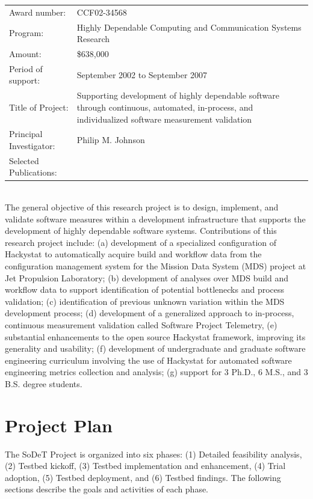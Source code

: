 \begin{tabular}{lp{4.5in}}

Award number: & CCF02-34568 \\
Program: & Highly Dependable Computing and Communication Systems Research\\
Amount: & \$638,000 \\
Period of support: & September 2002 to September 2007 \\
Title of Project: & Supporting development of highly dependable software through
continuous, automated, in-process, and individualized software measurement validation \\
Principal Investigator: & Philip M. Johnson \\
Selected Publications: & \cite{csdl2-04-22,csdl2-04-13,csdl2-04-11,csdl2-03-12,
csdl2-02-07,csdl2-03-07,csdl2-04-02,csdl2-04-04,csdl2-04-11,csdl2-06-07,csdl2-06-08,csdl2-06-13,csdl2-06-06}
\end{tabular} \\ %

The general objective of this  research project is to design,
implement, and validate software measures within a development
infrastructure that supports the development of highly dependable software
systems.  Contributions of this research project include: (a) development
of a specialized configuration of Hackystat to automatically acquire build
and workflow data from the configuration management system for the Mission
Data System (MDS) project at Jet Propulsion Laboratory; (b) development of
analyses over MDS build and workflow data to support identification of
potential bottlenecks and process validation; (c) identification of
previous unknown variation within the MDS development process; (d)
development of a generalized approach to in-process, continuous measurement
validation called Software Project Telemetry, (e) substantial enhancements
to the open source Hackystat framework, improving its generality and
usability; (f) development of undergraduate and graduate software
engineering curriculum involving the use of Hackystat for automated
software engineering metrics collection and analysis; (g) support for 3
Ph.D., 6 M.S., and 3 B.S. degree students.


\section{Project Plan}

The SoDeT Project is organized into six phases: 
(1) Detailed feasibility analysis, (2) Testbed kickoff, (3) Testbed
implementation and enhancement, (4) Trial adoption, (5) Testbed
deployment, and (6) Testbed findings.  The following sections describe
the goals and activities of each phase.  

